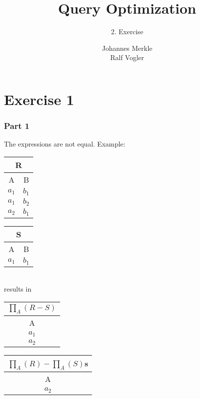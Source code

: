 \documentclass[11pt,a4paper]{scrartcl}
\begin{document}
\author{Johannes Merkle\\Ralf Vogler}
\title{Query Optimization}
\subtitle{2. Exercise}

\maketitle

\section*{Exercise 1}

\subsubsection*{Part 1}
The expressions are not equal. Example:\\

\begin{minipage}{.2\textwidth}
\begin{tabular}{|c|c|}
\hline
  \multicolumn{2}{|c|}{R} \\
  \hline
  A & B\\ \hline \hline
  $a_1$ & $b_1$\\
  $a_1$ & $b_2$\\
  $a_2$ & $b_1$\\
  \hline
\end{tabular}
\end{minipage}
\begin{minipage}{.2\textwidth}
\begin{tabular}{|c|c|}
\hline
  \multicolumn{2}{|c|}{S} \\
  \hline
  A & B\\ \hline \hline
  $a_1$ & $b_1$\\
  \hline  
\end{tabular}
\end{minipage}\\

 results in\\

\begin{minipage}{.5\textwidth}
\begin{tabular}{|c|}
\hline
  $\prod_A(R-S)$\\ \hline
  A\\ \hline \hline
  $a_1$\\ \hline
  $a_2$\\
  \hline  
\end{tabular}
\end{minipage}
\begin{minipage}{.5\textwidth}
\begin{tabular}{|c|}
\hline
  $\prod_A(R)-\prod_A(S)$s\\ \hline
  A\\ \hline \hline
  $a_2$\\
  \hline  
\end{tabular}
\end{minipage}\\
\end{document}
